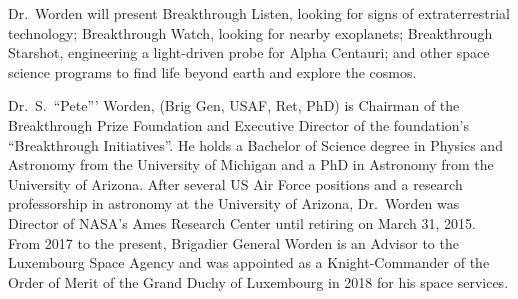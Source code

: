 \documentclass[a4paper,parskip,10pt]{scrartcl}
\begin{document}
    \vfill

    \begin{tcolorbox}[
        enhanced,
        title={Keynote Lecture 1: Pete Worden (Breakthrough Initiatives) \\ Life in the Universe and Private Sector Space Science Initiatives},
        sharp corners,
        colbacktitle=thistrack,
        fonttitle=\large\mediumfont,
        boxsep=0pt,
        boxrule=0pt,
        left*=0pt,
        lefttitle=4mm,
        toptitle=4mm,
        bottomtitle=4mm,
        top=0pt,
        bottom=0pt,
        sidebyside,
        sidebyside align=center,
        lefthand width=6cm,
        segmentation empty,
    ]%
        
        \tcblower

        \setlength{\parskip}{1ex}
        
        \vspace{1ex}
        Dr.~Worden will present Breakthrough Listen, looking for signs of extraterrestrial technology; Breakthrough Watch, looking for nearby exoplanets; Breakthrough Starshot, engineering a light-driven probe for Alpha Centauri; and other space science programs to find life beyond earth and explore the cosmos.

        {
            \small
            \color{white!20!black}
            Dr.~S.~``Pete''' Worden, (Brig Gen, USAF, Ret, PhD) is Chairman of the Breakthrough Prize Foundation and Executive Director of the foundation's ``Breakthrough Initiatives''. He holds a Bachelor of Science degree in Physics and Astronomy from the University of Michigan and a PhD in Astronomy from the University of Arizona. After several US Air Force positions and a research professorship in astronomy at the University of Arizona, Dr.~Worden was Director of NASA's Ames Research Center until retiring on March 31, 2015. From 2017 to the present, Brigadier General Worden is an Advisor to the Luxembourg Space Agency and was appointed as a Knight-Commander of the Order of Merit of the Grand Duchy of Luxembourg in 2018 for his space services.}

        

        \vspace{2ex}
    \end{tcolorbox}
\end{document}
